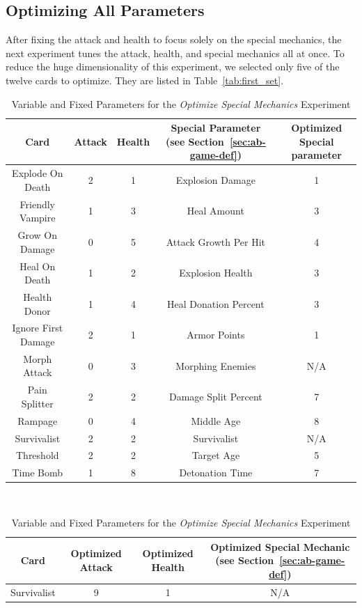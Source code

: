 \documentclass[letterpaper]{article} %
\begin{document}
\subsection{Optimizing All Parameters} \label{sec:first_set}

After fixing the attack and health to focus solely on the special mechanics, the next experiment tunes the attack, health, and special mechanics all at once. To reduce the huge dimensionality of this experiment, we selected only five of the twelve cards to optimize. They are listed in Table~\ref{tab:first_set}.

\begin{table}[t]
\centering
\begin{tabular}{||c c c c c||} 
 \hline
 Card & Attack & Health & Special Parameter (see Section~\ref{sec:ab-game-def}) &  Optimized Special parameter\\ [0.5ex] 
 \hline\hline
 Explode On Death & 2 & 1 & Explosion Damage & 1\\ 
 \hline
 Friendly Vampire & 1 & 3 & Heal Amount & 3 \\
 \hline
 Grow On Damage & 0 & 5 & Attack Growth Per Hit & 4 \\
 \hline
 Heal On Death & 1 & 2 & Explosion Health & 3 \\
 \hline
 Health Donor & 1 & 4 & Heal Donation Percent & 3 \\
 \hline
 Ignore First Damage & 2 & 1 & Armor Points & 1 \\
 \hline
 Morph Attack & 0 & 3 & Morphing Enemies & N/A \\
 \hline
 Pain Splitter & 2 & 2 & Damage Split Percent & 7 \\
 \hline
 Rampage & 0 & 4 & Middle Age & 8 \\
 \hline
 Survivalist & 2 & 2 & Survivalist & N/A \\
 \hline
 Threshold & 2 & 2 & Target Age & 5 \\
 \hline
 Time Bomb & 1 & 8 & Detonation Time & 7 \\ 
 \hline
\end{tabular}
\caption{Variable and Fixed Parameters for the \textit{Optimize Special Mechanics} Experiment\label{tab:special_cards}}
$ $\newline
\begin{tabular}{||c c c c||} 
 \hline
 Card & Optimized Attack & Optimized Health & Optimized Special Mechanic (see Section~\ref{sec:ab-game-def})\\ [0.5ex]
 \hline\hline
 Survivalist & 9 & 1 & N/A \\

\end{tabular}
\end{table}
\end{document}
